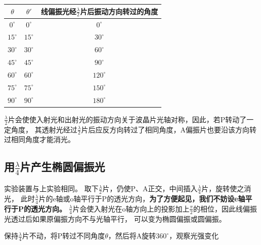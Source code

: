 \documentclass{article}
\newcommand{\degree}{^\circ}
\begin{document}
\begin{itemize}
        \begin{center}
            \begin{tabular}{|c|c|c|}
                \hline
                $\theta$ & $\theta '$ & 线偏振光经$\frac{\lambda}{2}$片后振动方向转过的角度 \\
                \hline
                $0\degree$ & $0\degree$ & $0\degree$ \\
                \hline
                $15\degree$ & $15\degree$ & $30\degree$ \\
                \hline
                $30\degree$ & $30\degree$ & $60\degree$ \\
                \hline
                $45\degree$ & $45\degree$ & $90\degree$ \\
                \hline
                $60\degree$ & $60\degree$ & $120\degree$ \\
                \hline
                $75\degree$ & $75\degree$ & $150\degree$ \\
                \hline
                $90\degree$ & $90\degree$ & $180\degree$ \\
                \hline
            \end{tabular}
        \end{center}
        
        $\frac{\lambda}{2}$片会使使入射光和出射光的振动方向关于波晶片光轴对称，因此，若P转动了一定角度，
        其透射光经过$\frac{\lambda}{2}$片后应反方向转过了相同角度，A偏振片也要沿该方向转过相同角度才能消光。
    \end{itemize}

    \subsection{用$\frac{\lambda}{4}$片产生椭圆偏振光}
    实验装置与上实验相同。
    取下$\frac{\lambda}{2}$片，仍使P、A正交，中间插入$\frac{\lambda}{4}$片，旋转使之消光，
    此时$\frac{\lambda}{4}$片的e轴或o轴平行于P的透光方向，\textbf{为了方便起见，我们不妨设e轴平行于P的透光方向。}
    $\frac{\lambda}{4}$片会使入射光在o轴方向上的投影加上$\frac{\pi}{2}$的相位，因此线偏振光透过后如果原偏振方向不与光轴平行，
    可以变为椭圆偏振或圆偏振。
    
    保持$\frac{\lambda}{4}$片不动，将P转过不同角度$\theta$，然后将A旋转$360\degree$，观察光强变化
\end{document}
